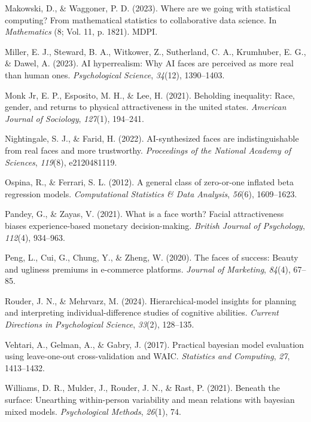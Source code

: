 \documentclass[
  jou,
  floatsintext,
  longtable,
  nolmodern,
  notxfonts,
  notimes,
  colorlinks=true,linkcolor=blue,citecolor=blue,urlcolor=blue]{apa7}
\newlength{\cslhangindent}
\newenvironment{CSLReferences}[2] %
 {\begin{list}{}{%
  \setlength{\itemindent}{0pt}
  \setlength{\leftmargin}{0pt}
  \setlength{\parsep}{0pt}
  \ifodd #1
   \setlength{\leftmargin}{\cslhangindent}
   \setlength{\itemindent}{-1\cslhangindent}
  \fi
  \setlength{\itemsep}{#2\baselineskip}}}
 {\end{list}}
\begin{document}
\begin{CSLReferences}{1}{0}
Makowski, D., \& Waggoner, P. D. (2023). Where are we going with
statistical computing? From mathematical statistics to collaborative
data science. In \emph{Mathematics} (8; Vol. 11, p. 1821). MDPI.

Miller, E. J., Steward, B. A., Witkower, Z., Sutherland, C. A.,
Krumhuber, E. G., \& Dawel, A. (2023). AI hyperrealism: Why AI faces are
perceived as more real than human ones. \emph{Psychological Science},
\emph{34}(12), 1390--1403.

Monk Jr, E. P., Esposito, M. H., \& Lee, H. (2021). Beholding
inequality: Race, gender, and returns to physical attractiveness in the
united states. \emph{American Journal of Sociology}, \emph{127}(1),
194--241.

Nightingale, S. J., \& Farid, H. (2022). AI-synthesized faces are
indistinguishable from real faces and more trustworthy.
\emph{Proceedings of the National Academy of Sciences}, \emph{119}(8),
e2120481119.

Ospina, R., \& Ferrari, S. L. (2012). A general class of zero-or-one
inflated beta regression models. \emph{Computational Statistics \& Data
Analysis}, \emph{56}(6), 1609--1623.

Pandey, G., \& Zayas, V. (2021). What is a face worth? Facial
attractiveness biases experience-based monetary decision-making.
\emph{British Journal of Psychology}, \emph{112}(4), 934--963.

Peng, L., Cui, G., Chung, Y., \& Zheng, W. (2020). The faces of success:
Beauty and ugliness premiums in e-commerce platforms. \emph{Journal of
Marketing}, \emph{84}(4), 67--85.

Rouder, J. N., \& Mehrvarz, M. (2024). Hierarchical-model insights for
planning and interpreting individual-difference studies of cognitive
abilities. \emph{Current Directions in Psychological Science},
\emph{33}(2), 128--135.

Vehtari, A., Gelman, A., \& Gabry, J. (2017). Practical bayesian model
evaluation using leave-one-out cross-validation and WAIC.
\emph{Statistics and Computing}, \emph{27}, 1413--1432.

Williams, D. R., Mulder, J., Rouder, J. N., \& Rast, P. (2021). Beneath
the surface: Unearthing within-person variability and mean relations
with bayesian mixed models. \emph{Psychological Methods}, \emph{26}(1),
74.

\end{CSLReferences}
\end{document}
